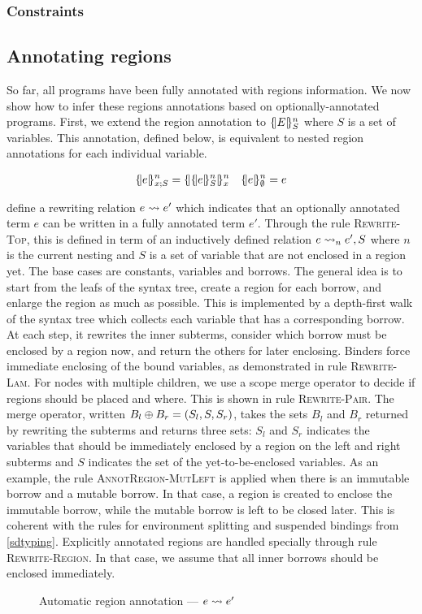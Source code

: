 \subsubsection{Constraints}




\clearpage

\subsection{Annotating regions}
\label{regionannot}

So far, all \lang programs have been fully annotated with regions information.
We now show how to infer these regions annotations based on
optionally-annotated programs.
First, we extend the region annotation to $\region{S}{E}$ where $S$ is
a set of variables. This annotation, defined below, is equivalent to nested
region annotations for each individual variable.

\begin{align*}
  \region{x;S}{e} &= \region{x}{\region{S}{e}}& \region{\emptyset}{e} &= e\\
\end{align*}

 define a rewriting relation $\RannotT{e}{e'}$
which indicates that an optionally annotated term $e$ can be written
in a fully annotated term $e'$.
Through the rule \textsc{Rewrite-Top}, this is defined
in term of an inductively defined relation
$\Rannot{e}{e'}{S}$ where $n$ is the current nesting and $S$ is a set of
variable that are not enclosed in a region yet.
The base cases are constants, variables and borrows.
The general idea is to start from the leafs of the syntax tree, create a
region for each borrow, and enlarge the region as much as possible.
This is implemented by a depth-first walk of the syntax
tree which collects each variable that has a corresponding borrow.
At each step, it rewrites the inner subterms,
consider which borrow must be enclosed by a region now, and
return the others for later enclosing. Binders force immediate
enclosing of the bound variables, as demonstrated in rule \textsc{Rewrite-Lam}.
For nodes with multiple children, we
use a scope merge operator to decide if regions should be placed and where.
This is shown in rule \textsc{Rewrite-Pair}.
The merge operator, written $\getBorrows{B_l}{B_r}{(S_l,S,S_r)}$, takes
the sets $B_l$ and $B_r$ returned by rewriting the subterms
and returns three sets: $S_l$ and $S_r$ indicates the variables
that should be immediately enclosed by a region on the left and right
subterms and $S$ indicates the set of the yet-to-be-enclosed variables.
As an example, the rule \textsc{AnnotRegion-MutLeft} is applied
when there is an immutable borrow and a mutable borrow. In that case, a
region is created to enclose the immutable borrow, while the mutable
borrow is left to be closed later. This is coherent with the rules
for environment splitting and suspended bindings from \cref{sdtyping}.
%
Explicitly annotated regions are handled specially through
rule \textsc{Rewrite-Region}. In that case, we assume that all inner
borrows should be enclosed immediately.

\begin{figure*}[!hbt]
  \centering
  
  \caption{Automatic region annotation --- $\RannotT{e}{e'}$}
  \label{fig:region-annotation}
\end{figure*}

